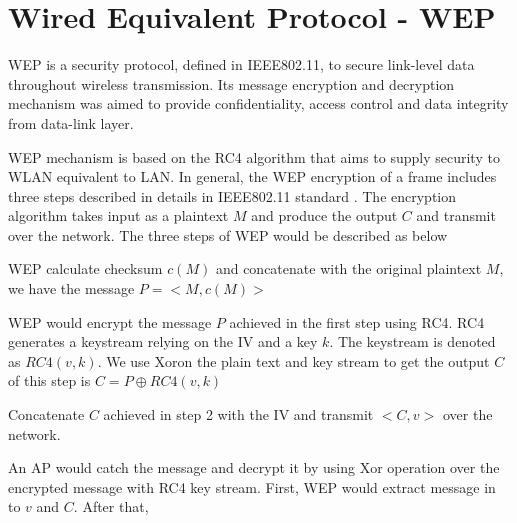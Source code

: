 \section{Wired Equivalent Protocol - WEP}


\ac{WEP} is a security protocol, defined in \ac{IEEE}802.11, to secure link-level data throughout wireless transmission. Its message encryption and decryption mechanism was aimed to provide confidentiality, access control and data integrity from data-link layer.

\ac{WEP} mechanism is based on the \ac{RC4} algorithm\cite{mousa2006evaluation} that aims to supply security to \ac{WLAN} equivalent to \ac{LAN}. In general, the \ac{WEP} encryption of a frame includes three steps described in details in \ac{IEEE}802.11 standard \cite{al2006ieee}. The encryption algorithm takes input as a plaintext $M$ and produce the output $C$ and transmit over the network. The three steps of \ac{WEP} would be described as below
\begin{steps}
	\item \ac{WEP} calculate checksum $c(M)$ and concatenate with the original plaintext $M$, we have the message $P = <M, c(M)>$
	\item \ac{WEP} would encrypt the message $P$ achieved in the first step using \ac{RC4}. \ac{RC4} generates a keystream relying on the \ac{IV} and a key $k$. The keystream is denoted as $RC4(v,k)$. We use \ac{Xor}on the plain text and key stream to get the output $C$ of this step is $C = P \oplus RC4(v,k)$
	\item Concatenate $C$ achieved in step 2 with the \ac{IV} and transmit $<C, v>$ over the network.
\end{steps}

An \ac{AP} would catch the message and decrypt it by using \ac{Xor} operation over the encrypted message with \ac{RC4} key stream.  First, \ac{WEP} would extract message in to $v$ and $C$. After that, 